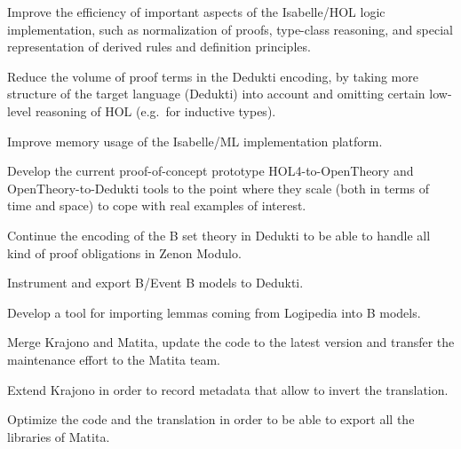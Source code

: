 \begin{workpackage}
\begin{tasklist}
\begin{task}[id=isabelle,
  title=Instrument Isabelle,
  lead=Tum,
  TumRM=5,
  wphases=1-12]
%
\begin{compactitem}
\item Improve the efficiency of important aspects of the
  Isabelle/HOL logic implementation, such as normalization of proofs,
  type-class reasoning, and special representation of derived rules
  and definition principles.
\item Reduce the volume of proof terms in the Dedukti encoding, by
taking more structure of the target language (Dedukti) into account
and omitting certain low-level reasoning of HOL (e.g.\ for inductive
types).
\item Improve memory usage of the Isabelle/ML implementation platform.
\end{compactitem}
\end{task}

\begin{task}[id=HOL4,
  title=Instrument HOL4,
  lead=Cha,
  ChaRM=16,
  wphases=1-14]
%
\begin{compactitem}
\item Develop the current proof-of-concept prototype
    HOL4-to-OpenTheory and OpenTheory-to-Dedukti tools to the point
    where they scale (both in terms of time and space) to cope with
    real examples of interest.
\end{compactitem}
\end{task}

\begin{task}[id=atelier-b,
  title=Instrument Atelier-B/Rodin,
  lead=Imt,
  CleRM=14,
  ImtRM=1,
  TouRM=11,
  wphases=1-48]
%
\begin{compactitem}
\item Continue the encoding of the B set theory in Dedukti to be
  able to handle all kind of proof obligations in Zenon Modulo.
\item Instrument and export B/Event B models to Dedukti.
\item Develop a tool for importing lemmas coming from Logipedia
into B models.
\end{compactitem}
\end{task}

\begin{task}[id=matita,
  title=Integrate the Matita translator in Matita itself,
  lead=Bol,
  BolRM=4,
  wphases=1-12]
\begin{compactitem}
\item Merge Krajono and Matita, update the code to the latest
  version and transfer the maintenance effort to the Matita team.
\item Extend Krajono in order to record metadata that allow to
  invert the translation.
\item Optimize the code and the translation in order to be able to
  export all the libraries of Matita.
\end{compactitem}
\end{task}


\end{tasklist}
\end{workpackage}
